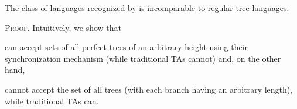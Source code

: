 %
%
%
%


\begin{theorem} \label{thm:expressiveness}
The class of languages recognized by \lstas is incomparable to regular tree languages.
\end{theorem}

\lstaexample
%
\textsc{Proof.}
Intuitively, we show that
\begin{inparaenum}[(i)]
  \item  \lstas can accept sets of all perfect trees of an arbitrary height
    using their synchronization mechanism (while traditional TAs cannot) and,
    on the other hand,
  \item \lstas cannot accept the set of all trees (with each branch having an
    arbitrary length), while traditional TAs can.
\end{inparaenum}

